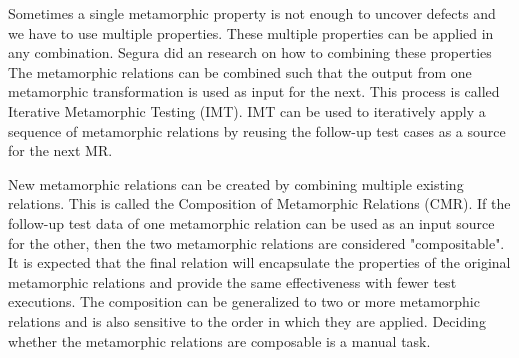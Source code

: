 Sometimes a single metamorphic property is not enough to uncover defects and we have to use multiple properties. These multiple properties can be applied in any combination. Segura did an research on how to combining these properties
\cite{Segura2016} The metamorphic relations can be combined such that the output from one metamorphic transformation is used as input for the next. This process is called Iterative Metamorphic Testing (IMT). IMT can be used to iteratively apply a sequence of metamorphic relations by reusing the follow-up test cases as a source for the next MR.
 \par
New metamorphic relations can be created by combining multiple existing relations. This is called the Composition of Metamorphic Relations (CMR)\cite{Segura2016}. If the follow-up test data of one metamorphic relation can be used as an input source for the other, then the two metamorphic relations are considered "compositable". It is expected that the final relation will encapsulate the properties of the original metamorphic relations and provide the same effectiveness with fewer test executions. The composition can be generalized to two or more metamorphic relations and is also sensitive to the order in which they are applied. Deciding whether the metamorphic relations are composable is a manual task. 

